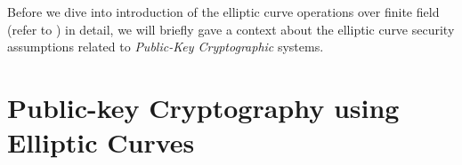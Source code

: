%
Before we dive into introduction of the elliptic curve operations over finite field (refer to  ) in detail, we will briefly gave a context about the elliptic curve security assumptions related to \textit{Public-Key Cryptographic} systems.  

\section{Public-key Cryptography using Elliptic Curves}
\label{sec:ch01.motivationPairingCryptography}



